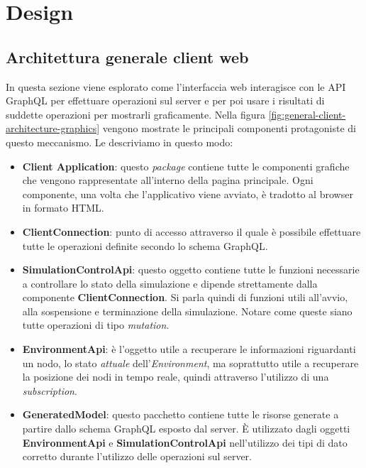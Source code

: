 \chapter{Design}


%

\section{Architettura generale client web}
In questa sezione viene esplorato come l'interfaccia web interagisce con le \ac{API} GraphQL per effettuare operazioni sul server e per poi usare i risultati di suddette operazioni per mostrarli graficamente. Nella figura \ref{fig:general-client-architecture-graphics} vengono mostrate le principali componenti protagoniste di questo meccanismo. Le descriviamo in questo modo:

 \begin{itemize}
	\item \textbf{Client Application}: questo \textit{package} contiene tutte le componenti grafiche che vengono rappresentate all'interno della pagina principale. Ogni componente, una volta che l'applicativo viene avviato, è tradotto al browser in formato HTML.
	\item \textbf{ClientConnection}: punto di accesso attraverso il quale è possibile effettuare tutte le operazioni definite secondo lo schema GraphQL. 
	\item \textbf{SimulationControlApi}: questo oggetto contiene tutte le funzioni necessarie a controllare lo stato della simulazione e dipende strettamente dalla componente \textbf{ClientConnection}. Si parla quindi di funzioni utili all'avvio, alla sospensione e terminazione della simulazione. Notare come queste siano tutte operazioni di tipo \textit{mutation}.
	\item \textbf{EnvironmentApi}: è l'oggetto utile a recuperare le informazioni riguardanti un nodo, lo stato \textit{attuale} dell'\textit{Environment}, ma soprattutto utile a recuperare la posizione dei nodi in tempo reale, quindi attraverso l'utilizzo di una \textit{subscription}. 
	\item \textbf{GeneratedModel}: questo pacchetto contiene tutte le risorse generate a partire dallo schema GraphQL esposto dal server. È utilizzato dagli oggetti \textbf{EnvironmentApi} e \textbf{SimulationControlApi} nell'utilizzo dei tipi di dato corretto durante l'utilizzo delle operazioni sul server.
 \end{itemize}

